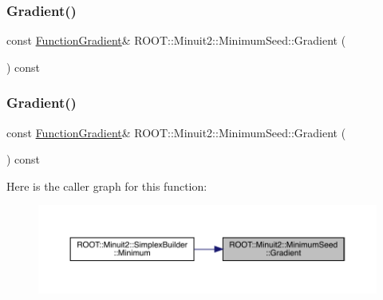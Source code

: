 \mbox{\label{classROOT_1_1Minuit2_1_1MinimumSeed_acde7a067ded2fb87a3dba51ba82a1afd}} 
\subsubsection{\texorpdfstring{Gradient()}{Gradient()}\hspace{0.1cm}{\footnotesize\ttfamily [1/2]}}
{\footnotesize\ttfamily const \mbox{\hyperlink{classROOT_1_1Minuit2_1_1FunctionGradient}{Function\+Gradient}}\& R\+O\+O\+T\+::\+Minuit2\+::\+Minimum\+Seed\+::\+Gradient (\begin{DoxyParamCaption}{ }\end{DoxyParamCaption}) const\hspace{0.3cm}{\ttfamily [inline]}}

\mbox{\label{classROOT_1_1Minuit2_1_1MinimumSeed_acde7a067ded2fb87a3dba51ba82a1afd}} 
\subsubsection{\texorpdfstring{Gradient()}{Gradient()}\hspace{0.1cm}{\footnotesize\ttfamily [2/2]}}
{\footnotesize\ttfamily const \mbox{\hyperlink{classROOT_1_1Minuit2_1_1FunctionGradient}{Function\+Gradient}}\& R\+O\+O\+T\+::\+Minuit2\+::\+Minimum\+Seed\+::\+Gradient (\begin{DoxyParamCaption}{ }\end{DoxyParamCaption}) const\hspace{0.3cm}{\ttfamily [inline]}}

Here is the caller graph for this function\+:\nopagebreak
\begin{figure}[H]
\begin{center}
\leavevmode
\includegraphics[width=350pt]{d1/d50/classROOT_1_1Minuit2_1_1MinimumSeed_acde7a067ded2fb87a3dba51ba82a1afd_icgraph}
\end{center}
\end{figure}
\mbox{\label{classROOT_1_1Minuit2_1_1MinimumSeed_a5d9ffd4dbd68f6cfcfef821844e70158}} 
